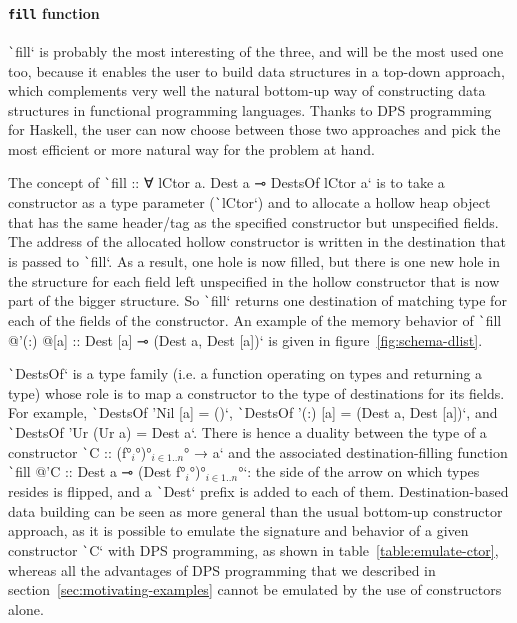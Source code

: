 \documentclass[english]{jflart}
\begin{document}
\paragraph{\texttt{fill} function}

\texttt`fill` is probably the most interesting of the three, and will be the most used one too, because it enables the user to build data structures in a top-down approach, which complements very well the natural bottom-up way of constructing data structures in functional programming languages. Thanks to DPS programming for Haskell, the user can now choose between those two approaches and pick the most efficient or more natural way for the problem at hand.

The concept of \texttt`fill :: ∀ lCtor a. Dest a ⊸ DestsOf lCtor a` is to take a constructor as a type parameter (\texttt`lCtor`) and to allocate a hollow heap object that has the same header/tag as the specified constructor but unspecified fields. The address of the allocated hollow constructor is written in the destination that is passed to \texttt`fill`. As a result, one hole is now filled, but there is one new hole in the structure for each field left unspecified in the hollow constructor that is now part of the bigger structure. So \texttt`fill` returns one destination of matching type for each of the fields of the constructor. An example of the memory behavior of \texttt`fill @'(:) @[a] :: Dest [a] ⊸ (Dest a, Dest [a])` is given in figure~\ref{fig:schema-dlist}.

\texttt`DestsOf` is a type family (i.e. a function operating on types and returning a type) whose role is to map a constructor to the type of destinations for its fields. For example, \texttt`DestsOf 'Nil [a] = ()`, \texttt`DestsOf '(:) [a] = (Dest a, Dest [a])`, and \texttt`DestsOf 'Ur (Ur a) = Dest a`. There is hence a duality between the type of a constructor \texttt`C :: (f°$_i$°)°$_{i \in 1..n}$° → a` and the associated destination-filling function \texttt`fill @'C :: Dest a ⊸ (Dest f°$_i$°)°$_{i \in 1..n}$°`: the side of the arrow on which types resides is flipped, and a \texttt`Dest` prefix is added to each of them. Destination-based data building can be seen as more general than the usual bottom-up constructor approach, as it is possible to emulate the signature and behavior of a given constructor \texttt`C` with DPS programming, as shown in table~\ref{table:emulate-ctor}, whereas all the advantages of DPS programming that we described in section~\ref{sec:motivating-examples} cannot be emulated by the use of constructors alone.
\end{document}
